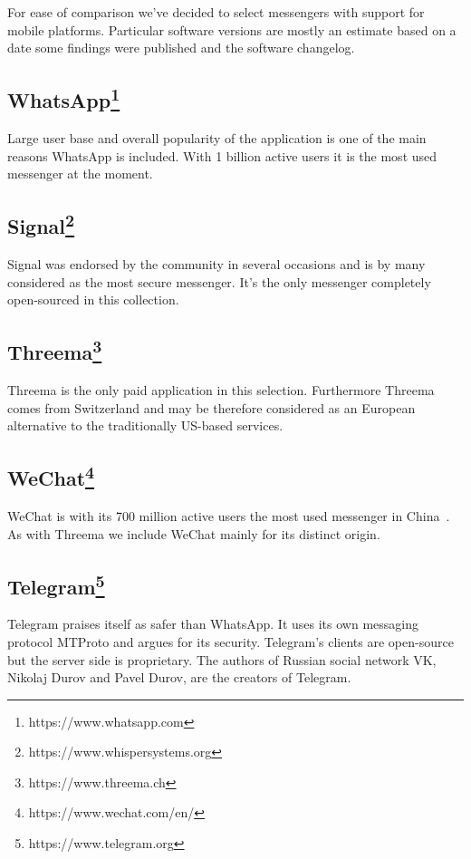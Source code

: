 \documentclass[thesis=M,english]{FITthesis}[2012/10/20]
\begin{document}
For ease of comparison we've decided to select messengers with support for mobile platforms. Particular software versions are mostly an estimate based on a date some findings were published and the software changelog.


\subsection{WhatsApp\protect\footnote{https://www.whatsapp.com}}

Large user base and overall popularity of the application is one of the main reasons WhatsApp is included. With 1 billion active users it is the most used messenger at the moment.\cite{whatsappusers}

\subsection{Signal\protect\footnote{https://www.whispersystems.org}}

Signal was endorsed by the community in several occasions and is by many considered as the most secure messenger. It's the only messenger completely open-sourced in this collection.

\subsection{Threema\protect\footnote{https://www.threema.ch}}

Threema is the only paid application in this selection. Furthermore Threema comes from Switzerland and may be therefore considered as an European alternative to the traditionally US-based services.

\subsection{WeChat\protect\footnote{https://www.wechat.com/en/}}

WeChat is with its 700 million active users the most used messenger in China~\cite{wechat-users}. As with Threema we include WeChat mainly for its distinct origin.

\subsection{Telegram\protect\footnote{https://www.telegram.org}}

Telegram praises itself as safer than WhatsApp. It uses its own messaging protocol MTProto and argues for its security. Telegram's clients are open-source but the server side is proprietary. The authors of Russian social network VK, Nikolaj Durov and Pavel Durov, are the creators of Telegram.
\end{document}
